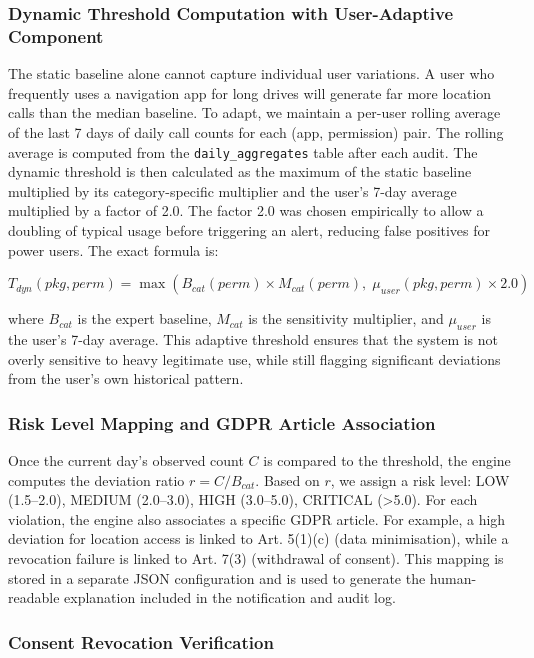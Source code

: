 \subsubsection{Dynamic Threshold Computation with User-Adaptive Component}

The static baseline alone cannot capture individual user variations. A user who frequently uses a navigation app for long drives will generate far more location calls than the median baseline. To adapt, we maintain a per-user rolling average of the last 7 days of daily call counts for each (app, permission) pair. The rolling average is computed from the \texttt{daily\_aggregates} table after each audit. The dynamic threshold is then calculated as the maximum of the static baseline multiplied by its category-specific multiplier and the user's 7-day average multiplied by a factor of 2.0. The factor 2.0 was chosen empirically to allow a doubling of typical usage before triggering an alert, reducing false positives for power users. The exact formula is:

\[
T_{dyn}(pkg, perm) = \max\left( B_{cat}(perm) \times M_{cat}(perm), \; \mu_{user}(pkg, perm) \times 2.0 \right)
\]

where \(B_{cat}\) is the expert baseline, \(M_{cat}\) is the sensitivity multiplier, and \(\mu_{user}\) is the user's 7-day average. This adaptive threshold ensures that the system is not overly sensitive to heavy legitimate use, while still flagging significant deviations from the user's own historical pattern.

\subsubsection{Risk Level Mapping and GDPR Article Association}

Once the current day's observed count \(C\) is compared to the threshold, the engine computes the deviation ratio \(r = C / B_{cat}\). Based on \(r\), we assign a risk level: LOW (1.5–2.0), MEDIUM (2.0–3.0), HIGH (3.0–5.0), CRITICAL (>5.0). For each violation, the engine also associates a specific GDPR article. For example, a high deviation for location access is linked to Art. 5(1)(c) (data minimisation), while a revocation failure is linked to Art. 7(3) (withdrawal of consent). This mapping is stored in a separate JSON configuration and is used to generate the human-readable explanation included in the notification and audit log.

\subsubsection{Consent Revocation Verification}

